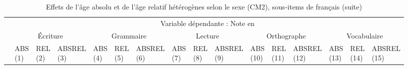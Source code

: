 \documentclass[
]{book}
\begin{document}
\begin{ThreePartTable}
\begin{longtable}[t]{llllllllllllllll}
\midrule
\endfirsthead
\caption[]{\label{tab:agemodelsrelsexessitemsfrench}Effets de l'âge absolu et de l'âge relatif hétérogènes selon le sexe (CM2), sous-items de français (suite)}\\
\toprule
\multicolumn{1}{c}{} & \multicolumn{15}{c}{Variable dépendante : Note en } \\
\cmidrule(l{3pt}r{3pt}){2-16}
\multicolumn{1}{c}{} & \multicolumn{3}{c}{Écriture} & \multicolumn{3}{c}{Grammaire} & \multicolumn{3}{c}{Lecture} & \multicolumn{3}{c}{Orthographe} & \multicolumn{3}{c}{Vocabulaire} \\
\cmidrule(l{3pt}r{3pt}){2-4} \cmidrule(l{3pt}r{3pt}){5-7} \cmidrule(l{3pt}r{3pt}){8-10} \cmidrule(l{3pt}r{3pt}){11-13} \cmidrule(l{3pt}r{3pt}){14-16}
 & \makecell{ABS \\ (1) } & \makecell{REL \\ (2) } & \makecell{ABSREL \\ (3) } & \makecell{ABS \\ (4) } & \makecell{REL \\ (5) } & \makecell{ABSREL \\ (6) } & \makecell{ABS \\ (7) } & \makecell{REL \\ (8) } & \makecell{ABSREL \\ (9) } & \makecell{ABS \\ (10) } & \makecell{REL \\ (11) } & \makecell{ABSREL \\ (12) } & \makecell{ABS \\ (13) } & \makecell{REL \\ (14) } & \makecell{ABSREL \\ (15) }\\
\midrule
\endhead


\end{longtable}
\end{ThreePartTable}
\end{document}
